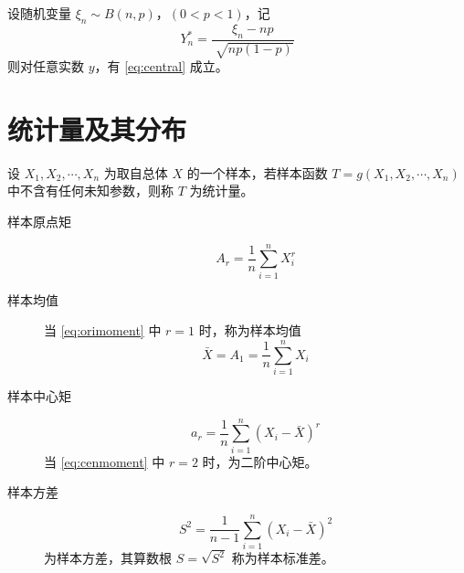 \documentclass{ctexbook}
\begin{document}
\begin{theorem}
    设随机变量 $\xi_n\sim B(n,p)$，$(0<p<1)$，记
    \begin{equation}
        Y_n^*=\frac{\xi_n-np}{\sqrt[]{np(1-p)}}
    \end{equation}
    则对任意实数 $y$，有 \eqref{eq:central} 成立。
\end{theorem}

\chapter{统计量及其分布}

\begin{definition}[统计量]
    设 $X_1,X_2,\cdots,X_n$ 为取自总体 $X$ 的一个样本，若样本函数 $T=g(X_1,X_2,\cdots,X_n)$ 中不含有任何未知参数，则称 $T$ 为统计量。
    \begin{description}
        \item[样本原点矩]
        \begin{equation}\label{eq:orimoment}
            A_r=\frac{1}{n}\sum_{i=1}^n X_i^r
        \end{equation}
        \item[样本均值]
        当 \eqref{eq:orimoment} 中 $r=1$ 时，称为样本均值
        \begin{equation}
            \bar{X}=A_1=\frac{1}{n}\sum_{i=1}^n X_i
        \end{equation}
        \item[样本中心矩]
        \begin{equation}\label{eq:cenmoment}
            a_r=\frac{1}{n}\sum_{i=1}^n (X_i-\bar{X})^r
        \end{equation}
        当 \eqref{eq:cenmoment} 中 $r=2$ 时，为二阶中心矩。
        \item[样本方差]
        \begin{equation}
            S^2=\frac{1}{n-1}\sum_{i=1}^n (X_i-\bar{X})^2 
        \end{equation}
        为样本方差，其算数根 $S=\sqrt{S^2}$ 称为样本标准差。
    \end{description}
\end{definition}
\end{document}
